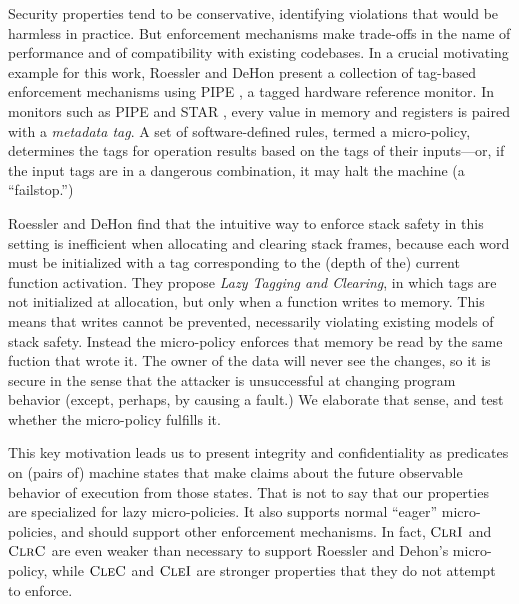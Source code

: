 Security properties tend to be conservative, identifying violations that would be
harmless in practice. But enforcement mechanisms make trade-offs in the name of performance
and of compatibility with existing codebases. In a crucial motivating example for this work,
Roessler and DeHon \cite{} present a collection of tag-based enforcement mechanisms
using PIPE \cite{???}, a tagged hardware reference monitor. In monitors such as PIPE and
STAR \cite{???}, every value in memory and registers is paired with a {\em metadata tag}.
A set of software-defined rules, termed a micro-policy, determines the tags for operation
results based on the tags of their inputs---or, if the input tags are in a dangerous
combination, it may halt the machine (a ``failstop.'')

Roessler and DeHon find that the intuitive way to enforce stack safety in this setting
is inefficient when allocating and clearing stack frames, because each word must be initialized
with a tag corresponding to the (depth of the) current function activation. They propose
{\em Lazy Tagging and Clearing}, in which tags are not initialized at allocation, but only
when a function writes to memory. This means that writes cannot be prevented, necessarily
violating existing models of stack safety. Instead the micro-policy enforces that memory be
read by the same fuction that wrote it. The owner of the data will never see the changes,
so it is secure in the sense that the attacker is unsuccessful at changing program behavior
(except, perhaps, by causing a fault.) We elaborate that sense, and test whether the
micro-policy fulfills it.

This key motivation leads us to present integrity and confidentiality as predicates on (pairs of)
machine states that make claims about the future observable behavior of execution from those states.
That is not to say that our properties are specialized for lazy micro-policies. It also supports
normal ``eager'' micro-policies, and should support other enforcement mechanisms. In fact, \(\textnormal{\sc ClrI}\)
and \(\textnormal{\sc ClrC}\) are even weaker than necessary to support Roessler and Dehon's micro-policy,
while \(\textnormal{\sc CleC}\) and \(\textnormal{\sc CleI}\) are stronger properties that they do not attempt to enforce.
%

